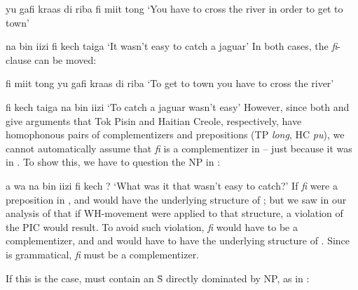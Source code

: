\ea\label{ex:2:202}
yu gafi kraas di riba fi miit tong
\glt `You have to cross the river in order to get to town'
\z


\ea\label{ex:2:203}
na bin iizi fi kech taiga
\glt `It wasn't easy to catch a jaguar'
\z
In both cases, the \textit{fi}-clause can be moved:

\ea\label{ex:2:204}
 fi miit tong yu gafi kraas di riba
\glt `To get to town you have to cross the river'
\z

\ea\label{ex:2:205}
fi kech taiga na bin iizi
\glt `To catch a jaguar wasn't easy'
\z
However, since both \citet{Woolford1979} and \citet{KoopmanEtAl1981} give arguments that Tok Pisin and Haitian Creole, respectively, have homophonous pairs of complementizers and prepositions (TP \textit{long}, HC \textit{pu}), we cannot automatically assume that \textit{fi} is a complementizer in -- just because it was in . To show this, we have to question the NP in :

\ea\label{ex:2:206}
a wa na bin iizi fi kech ?
\glt `What was it that wasn't easy to catch?'
\z
If \textit{fi} were a preposition in ,  and  would have the underlying structure of ; but we saw in our analysis of  that if WH-movement were applied to that structure, a violation of the PIC would result. To avoid such violation, \textit{fi} would have to be a complementizer, and  and  would have to have the underlying structure of . Since  is grammatical, \textit{fi} must be a complementizer.

If this is the case,  must contain an \=S directly dominated by NP, as in :

